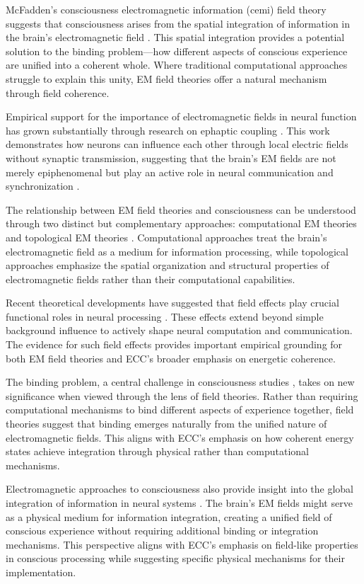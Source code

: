 \begin{refsection}
McFadden's consciousness electromagnetic information (cemi) field theory suggests that consciousness arises from the spatial integration of information in the brain's electromagnetic field \cite{McFadden2002}. This spatial integration provides a potential solution to the binding problem—how different aspects of conscious experience are unified into a coherent whole. Where traditional computational approaches struggle to explain this unity, EM field theories offer a natural mechanism through field coherence.

Empirical support for the importance of electromagnetic fields in neural function has grown substantially through research on ephaptic coupling \cite{Radman2007}. This work demonstrates how neurons can influence each other through local electric fields without synaptic transmission, suggesting that the brain's EM fields are not merely epiphenomenal but play an active role in neural communication and synchronization \cite{Frohlich2010}.

The relationship between EM field theories and consciousness can be understood through two distinct but complementary approaches: computational EM theories and topological EM theories \cite{Pockett2012}. Computational approaches treat the brain's electromagnetic field as a medium for information processing, while topological approaches emphasize the spatial organization and structural properties of electromagnetic fields rather than their computational capabilities.

Recent theoretical developments have suggested that field effects play crucial functional roles in neural processing \cite{Weiss2010}. These effects extend beyond simple background influence to actively shape neural computation and communication. The evidence for such field effects provides important empirical grounding for both EM field theories and ECC's broader emphasis on energetic coherence.

The binding problem, a central challenge in consciousness studies \cite{Singer2001}, takes on new significance when viewed through the lens of field theories. Rather than requiring computational mechanisms to bind different aspects of experience together, field theories suggest that binding emerges naturally from the unified nature of electromagnetic fields. This aligns with ECC's emphasis on how coherent energy states achieve integration through physical rather than computational mechanisms.

Electromagnetic approaches to consciousness also provide insight into the global integration of information in neural systems \cite{John2001}. The brain's EM fields might serve as a physical medium for information integration, creating a unified field of conscious experience without requiring additional binding or integration mechanisms. This perspective aligns with ECC's emphasis on field-like properties in conscious processing while suggesting specific physical mechanisms for their implementation.


\end{refsection}
